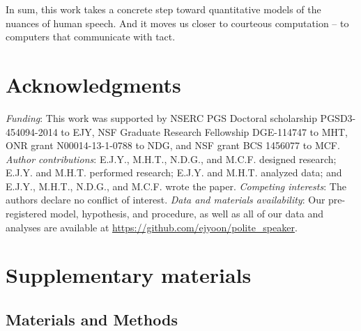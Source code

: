 \documentclass[12pt]{article}
\begin{document}
In sum, this work takes a concrete step toward quantitative models of
the nuances of human speech. And it moves us closer to courteous
computation -- to computers that communicate with tact.












\section*{Acknowledgments}
\emph{Funding}: This work was supported by NSERC PGS Doctoral scholarship
PGSD3-454094-2014 to EJY, NSF Graduate Research Fellowship DGE-114747 to
MHT, ONR grant N00014-13-1-0788 to NDG, and NSF grant BCS 1456077 to
MCF. 
\emph{Author contributions}: E.J.Y., M.H.T., N.D.G., and M.C.F. designed research; 
E.J.Y. and M.H.T. performed research; E.J.Y. and M.H.T. analyzed data; and E.J.Y., M.H.T., N.D.G., and M.C.F. wrote the paper.
\emph{Competing interests}: The authors declare no conflict of interest.
\emph{Data and materials availability}: Our pre-registered model,
hypothesis, and procedure, as well as all of our data and analyses are available at
\url{https://github.com/ejyoon/polite_speaker}.


\section*{Supplementary materials}

\subsection*{Materials and Methods}\label{materials-and-methods}
\end{document}
